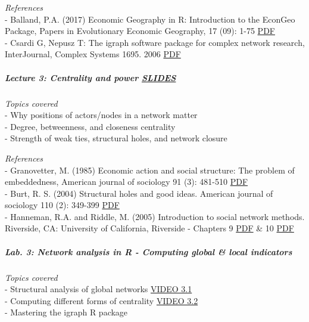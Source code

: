 \documentclass[
]{article}
\begin{document}
\emph{References}\\
- Balland, P.A. (2017) Economic Geography in R: Introduction to the
EconGeo Package, Papers in Evolutionary Economic Geography, 17 (09):
1-75
\href{https://peeg.wordpress.com/2017/05/09/17-09-economic-geography-in-r-introduction-to-the-econgeo-package/}{PDF}\\
- Csardi G, Nepusz T: The igraph software package for complex network
research, InterJournal, Complex Systems 1695. 2006
\href{http://www.necsi.edu/events/iccs6/papers/c1602a3c126ba822d0bc4293371c.pdf}{PDF}

\hypertarget{lecture-3-centrality-and-power-slides}{%
\subparagraph{\texorpdfstring{\textbf{Lecture 3: Centrality and power}
\href{https://github.com/PABalland/PABalland.github.io/raw/master/teaching/on/L3.pdf}{SLIDES}}{Lecture 3: Centrality and power SLIDES}}\label{lecture-3-centrality-and-power-slides}}

\emph{Topics covered}\\
- Why positions of actors/nodes in a network matter\\
- Degree, betweenness, and closeness centrality\\
- Strength of weak ties, structural holes, and network closure

\emph{References}\\
- Granovetter, M. (1985) Economic action and social structure: The
problem of embeddedness, American journal of sociology 91 (3): 481-510
\href{https://2c2e773f-85c0-4039-818c-ea517fc75085.filesusr.com/ugd/c5611b_0c0ac97925d74aaa914141a15b3bd734.pdf}{PDF}\\
- Burt, R. S. (2004) Structural holes and good ideas. American journal
of sociology 110 (2): 349-399
\href{http://www.econ.upf.edu/docs/seminars/burt.pdf}{PDF}\\
- Hanneman, R.A. and Riddle, M. (2005) Introduction to social network
methods. Riverside, CA: University of California, Riverside - Chapters 9
\href{http://faculty.ucr.edu/~hanneman/nettext/C9_Ego_networks.html}{PDF}
\& 10
\href{http://faculty.ucr.edu/~hanneman/nettext/C10_Centrality.html}{PDF}

\hypertarget{lab.-3-network-analysis-in-r---computing-global-local-indicators}{%
\subparagraph{\texorpdfstring{\textbf{Lab. 3: Network analysis in R -
Computing global \& local
indicators}}{Lab. 3: Network analysis in R - Computing global \& local indicators}}\label{lab.-3-network-analysis-in-r---computing-global-local-indicators}}

\emph{Topics covered}\\
- Structural analysis of global networks
\href{https://www.youtube.com/watch?v=JI3ibVmeopU\&feature=youtu.be}{VIDEO
3.1}\\
- Computing different forms of centrality
\href{https://youtu.be/57kuxJ-dVAI}{VIDEO 3.2}\\
- Mastering the igraph R package
\end{document}
